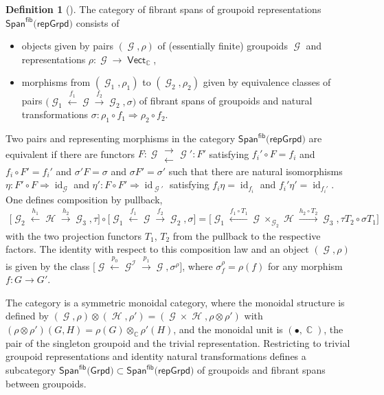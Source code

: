 \documentclass[10pt,a4paper]{amsart}
\DeclareMathOperator{\id}{id}
\DeclareMathOperator{\vect}{\mathsf{Vect}}
\DeclareMathOperator{\C}{\mathbb{C}}
\DeclareMathOperator{\calg}{\mathcal{G}}
\DeclareMathOperator{\calh}{\mathcal{H}}
\DeclareMathOperator{\cali}{\mathcal{I}}
\numberwithin{equation}{section}
\theoremstyle{definition}
\newtheorem{Definition}[Definition]{Definition}
\begin{document}
\begin{Definition}[{\cite[Lemmas 2.7 and~2.8]{FMM}}]
 \label{defFibSpan}
 The category of fibrant spans of groupoid representations $\mathsf{Span}^{\mathsf{fib}}(\mathsf{repGrpd)}$ consists of
 \begin{itemize}\itemsep=0pt
 \item objects given by pairs $(\calg, \rho)$ of (essentially finite) groupoids $\calg$ and representations $\rho\colon \calg \rightarrow \vect_{\C}$,
 \item morphisms from $(\calg_1, \rho_1)$ to $(\calg_2, \rho_2)$ given by equivalence classes of pairs $\bigl(\calg_1 \xleftarrow{f_1} \calg \xrightarrow{f_2} \calg_2, \sigma\bigr)$ of fibrant spans of groupoids and natural transformations $\sigma\colon \rho_1 \circ f_1 \Rightarrow \rho_2 \circ f_2$.
 \end{itemize}
 Two pairs \smash{$\bigl(\calg_1 \xleftarrow{f_1} \calg \xrightarrow{f_2} \calg_2, \sigma\bigr)$} and \smash{$\bigl(\calg_1 \xleftarrow{f_1'} \calg' \xrightarrow{f_2'} \calg_2, \sigma'\bigr)$} representing morphisms in the category $\mathsf{Span}^{\mathsf{fib}}(\mathsf{repGrpd)}$ are equivalent if there are functors $F\colon \calg \substack{\longrightarrow \\ \longleftarrow} \calg' : \!F' $ satisfying $f_i' \circ F = f_i$ and $f_i \circ F' = f_i'$ and $\sigma' F = \sigma$ and $\sigma F' = \sigma'$ such that there are natural isomorphisms $\eta\colon F' \circ F \Rightarrow \id_{\calg}$ and $\eta'\colon F \circ F' \Rightarrow \id_{\calg'}$ satisfying $f_i \eta = \id_{f_i}$ and $f_i' \eta' = \id_{f_i'}$. One defines composition by pullback,
 \begin{align*}
 \bigl[\calg_2 \xleftarrow{h_1} \calh \xrightarrow{h_2} \calg_3, \tau\bigr] \circ \bigl[\calg_1 \xleftarrow{f_1} \calg \xrightarrow{f_2} \calg_2, \sigma\bigr] = \bigl[\calg_1 \xleftarrow{f_1 \circ T_1} \calg \times_{\calg_2} \calh \xrightarrow{h_2 \circ T_2} \calg_3, \tau T_2 \circ \sigma T_1\bigr]
 \end{align*}
 with the two projection functors $T_1$, $T_2$ from the pullback to the respective factors. The identity with respect to this composition law and an object $(\calg, \rho)$ is given by the class $\bigl[\calg \xleftarrow{p_0} \calg^{\cali} \xrightarrow{p_1} \calg, \sigma^{\rho}\bigr]$, where $\sigma^{\rho}_{f} = \rho(f)$ for any morphism $f\colon G \rightarrow G'$.
\end{Definition}
The category  is a symmetric monoidal category, where the monoidal structure is defined by $(\calg, \rho) \otimes (\calh, \rho') = (\calg \times \calh, \rho \otimes \rho')$ with $(\rho \otimes \rho')(G, H) = \rho(G) \otimes_{\C} \rho'(H)$, and the monoidal unit is $(\bullet, \C)$, the pair of the singleton groupoid and the trivial representation. Restricting to trivial groupoid representations and identity natural transformations defines a subcategory $\mathsf{Span}^{\mathsf{fib}}(\mathsf{Grpd)} \subset \mathsf{Span}^{\mathsf{fib}}(\mathsf{repGrpd)}$ of groupoids and fibrant spans between groupoids.
\end{document}
